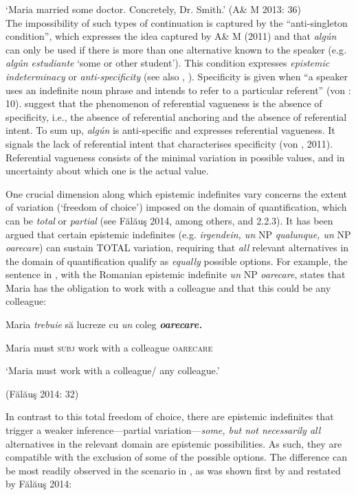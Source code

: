 \documentclass[output=paper]{langscibook}
\begin{document}
  ‘Maria married some doctor. Concretely, Dr. Smith.’
\gll  \textup{(A\& M 2013: 36)} \\
The impossibility of such types of continuation is captured by the “anti-singleton condition”, which expresses the idea captured by A\& M (2011) and \citet{GiannakidouQuer2013} that \textit{algún} can only be used if there is more than one alternative known to the speaker (e.g\textit{. algún estudiante} ‘some or other student’). This condition expresses \textit{epistemic indeterminacy} or \textit{anti-specificity} (see also \citealt{GiannakidouQuer2013}, \citealt{EtxeberriaGiannakidou2017}). Specificity is given when “a speaker uses an indefinite noun phrase and intends to refer to a particular referent” (von \citealt{Heusinger2011}: 10). \citet{GiannakidouQuer2013} suggest that the phenomenon of referential vagueness is the absence of specificity, i.e., the absence of referential anchoring and the absence of referential intent. To sum up, \textit{algún} is anti-specific and expresses referential vagueness. It signals the lack of referential intent that characterises specificity (von \citealt{Heusinger2002,Heusinger2007}, 2011). Referential vagueness consists of the minimal variation in possible values, and in uncertainty about which one is the actual value. 

  One crucial dimension along which epistemic indefinites vary concerns the extent of variation (‘freedom of choice’) imposed on the domain of quantification, which can be \textit{total} or \textit{partial} (see Fălăuş 2014, among others, and 2.2.3). It has been argued that certain epistemic indefinites (e.g. \textit{irgendein, un} NP \textit{qualunque, un} NP \textit{oarecare}) can sustain TOTAL variation, requiring that \textit{all} relevant alternatives in the domain of quantification qualify as \textit{equally} possible options. For example, the sentence in , with the Romanian epistemic indefinite \textit{un} NP \textit{oarecare}, states that Maria has the obligation to work with a colleague and that this could be any colleague:

\label{bkm:Ref533761905}  Maria  \textit{trebuie}  să  lucreze  cu  \textit{un}  coleg  \textbf{\textit{oarecare.}}

  Maria  must  \textsc{subj}  work  with  a  colleague  \textsc{oarecare}

  ‘Maria must work with a colleague/ any colleague.’

  (Fălăuş 2014: 32)

In contrast to this total freedom of choice, there are epistemic indefinites that trigger a weaker inference—partial variation—\textit{some, but not necessarily all} alternatives in the relevant domain are epistemic possibilities. As such, they are compatible with the exclusion of some of the possible options. The difference can be most readily observed in the scenario in , as was shown first by \citet{Alonso-OvalleMenéndez-Benito2010} and restated by Fălăuş 2014:
\end{document}
